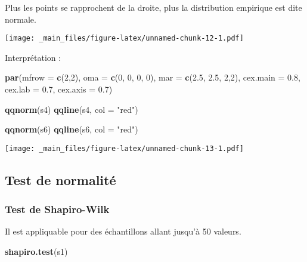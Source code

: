 \documentclass[
]{book}
\newenvironment{Shaded}{\begin{snugshade}}{\end{snugshade}}
\newcommand{\AttributeTok}[1]{\textcolor[rgb]{0.13,0.29,0.53}{#1}}
\newcommand{\DecValTok}[1]{\textcolor[rgb]{0.00,0.00,0.81}{#1}}
\newcommand{\FloatTok}[1]{\textcolor[rgb]{0.00,0.00,0.81}{#1}}
\newcommand{\FunctionTok}[1]{\textcolor[rgb]{0.13,0.29,0.53}{\textbf{#1}}}
\newcommand{\NormalTok}[1]{#1}
\newcommand{\StringTok}[1]{\textcolor[rgb]{0.31,0.60,0.02}{#1}}
\theoremstyle{definition}
\theoremstyle{definition}
\theoremstyle{definition}
\theoremstyle{definition}
\theoremstyle{remark}
\begin{document}
Plus les points se rapprochent de la droite, plus la distribution empirique est dite normale.

\texttt{[image: \_main\_files/figure-latex/unnamed-chunk-12-1.pdf]}

Interprétation :

\begin{Shaded}
\begin{Highlighting}[]
\FunctionTok{par}\NormalTok{(}\AttributeTok{mfrow =} \FunctionTok{c}\NormalTok{(}\DecValTok{2}\NormalTok{,}\DecValTok{2}\NormalTok{), }\AttributeTok{oma =} \FunctionTok{c}\NormalTok{(}\DecValTok{0}\NormalTok{, }\DecValTok{0}\NormalTok{, }\DecValTok{0}\NormalTok{, }\DecValTok{0}\NormalTok{), }\AttributeTok{mar =} \FunctionTok{c}\NormalTok{(}\FloatTok{2.5}\NormalTok{, }\FloatTok{2.5}\NormalTok{, }\DecValTok{2}\NormalTok{,}\DecValTok{2}\NormalTok{), }\AttributeTok{cex.main =} \FloatTok{0.8}\NormalTok{, }\AttributeTok{cex.lab =} \FloatTok{0.7}\NormalTok{, }\AttributeTok{cex.axis =} \FloatTok{0.7}\NormalTok{)}

\FunctionTok{qqnorm}\NormalTok{(s4)}
\FunctionTok{qqline}\NormalTok{(s4, }\AttributeTok{col =} \StringTok{"red"}\NormalTok{)}

\FunctionTok{qqnorm}\NormalTok{(s6)}
\FunctionTok{qqline}\NormalTok{(s6, }\AttributeTok{col =} \StringTok{"red"}\NormalTok{)}
\end{Highlighting}
\end{Shaded}

\texttt{[image: \_main\_files/figure-latex/unnamed-chunk-13-1.pdf]}

\hypertarget{test-de-normalituxe9}{%
\subsection{Test de normalité}\label{test-de-normalituxe9}}

\hypertarget{test-de-shapiro-wilk}{%
\subsubsection{Test de Shapiro-Wilk}\label{test-de-shapiro-wilk}}

Il est appliquable pour des échantillons allant jusqu'à 50 valeurs.

\begin{Shaded}
\begin{Highlighting}[]
\FunctionTok{shapiro.test}\NormalTok{(s1)}
\end{Highlighting}
\end{Shaded}
\end{document}
